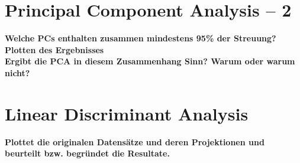 \documentclass[a4paper]{scrartcl}
\begin{document}
\section{Principal Component Analysis – 2}

\textbf{Welche PCs enthalten zusammen mindestens  95\% der Streuung?}\\


\textbf{Plotten des Ergebnisses}\\


\textbf{Ergibt die PCA in diesem Zusammenhang Sinn? Warum oder warum nicht?}\\
   
\section{Linear Discriminant Analysis}

\textbf{Plottet die originalen Datensätze und deren Projektionen und beurteilt bzw. begründet die Resultate.}
\end{document}
